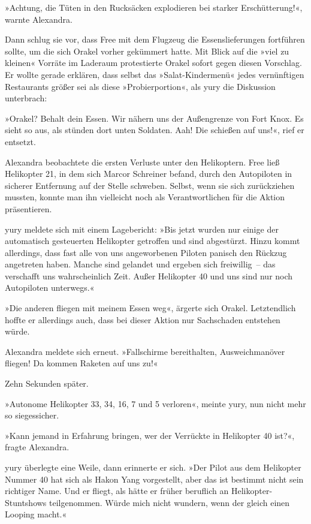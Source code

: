 »Achtung, die Tüten in den Rucksäcken explodieren bei starker Erschütterung!«, warnte Alexandra.

Dann schlug sie vor, dass Free mit dem Flugzeug die Essenslieferungen fortführen sollte, um die sich Orakel vorher gekümmert hatte. Mit Blick auf die »viel zu kleinen« Vorräte im Laderaum protestierte Orakel sofort gegen diesen Vorschlag. Er wollte gerade erklären, dass selbst das »Salat-Kindermenü« jedes vernünftigen Restaurants größer sei als diese »Probierportion«, als yury die Diskussion unterbrach:

»Orakel? Behalt dein Essen. Wir nähern uns der Außengrenze von Fort Knox. Es sieht so aus, als stünden dort unten Soldaten. Aah! Die schießen auf uns!«, rief er entsetzt.

Alexandra beobachtete die ersten Verluste unter den Helikoptern. Free ließ Helikopter 21, in dem sich Marcor Schreiner befand, durch den Autopiloten in sicherer Entfernung auf der Stelle schweben. Selbst, wenn sie sich zurückziehen mussten, konnte man ihn vielleicht noch als Verantwortlichen für die Aktion präsentieren.

yury meldete sich mit einem Lagebericht: »Bis jetzt wurden nur einige der automatisch gesteuerten Helikopter getroffen und sind abgestürzt. Hinzu kommt allerdings, dass fast alle von uns angeworbenen Piloten panisch den Rückzug angetreten haben. Manche sind gelandet und ergeben sich freiwillig~– das verschafft uns wahrscheinlich Zeit. Außer Helikopter 40 und uns sind nur noch Autopiloten unterwegs.«

»Die anderen fliegen mit meinem Essen weg«, ärgerte sich Orakel. Letztendlich hoffte er allerdings auch, dass bei dieser Aktion nur Sachschaden entstehen würde.

Alexandra meldete sich erneut. »Fallschirme bereithalten, Ausweichmanöver fliegen! Da kommen Raketen auf uns zu!«

Zehn Sekunden später.

»Autonome Helikopter 33, 34, 16, 7 und 5 verloren«, meinte yury, nun nicht mehr so siegessicher.

»Kann jemand in Erfahrung bringen, wer der Verrückte in Helikopter 40 ist?«, fragte Alexandra.

yury überlegte eine Weile, dann erinnerte er sich. »Der Pilot aus dem Helikopter Nummer 40 hat sich als Hakon Yang vorgestellt, aber das ist bestimmt nicht sein richtiger Name. Und er fliegt, als hätte er früher beruflich an Helikopter-Stuntshows teilgenommen. Würde mich nicht wundern, wenn der gleich einen Looping macht.«

